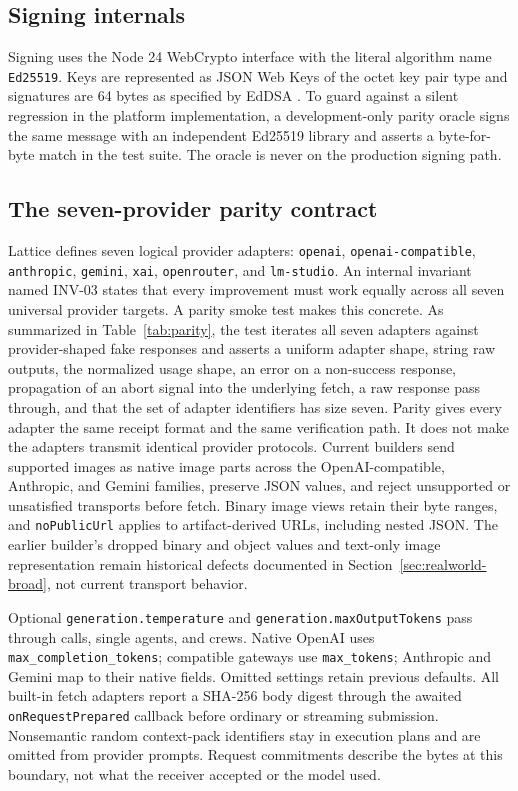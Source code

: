 \documentclass[conference]{IEEEtran}
\newcommand{\code}[1]{\texttt{\small #1}}
\begin{document}
\subsection{Signing internals}

Signing uses the Node 24 WebCrypto interface with the literal algorithm name
\code{Ed25519}. Keys are represented as JSON Web Keys of the octet key pair type and
signatures are 64 bytes as specified by EdDSA \cite{rfc8032}. To guard against a
silent regression in the platform implementation, a development-only parity oracle
signs the same message with an independent Ed25519 library and asserts a byte-for-byte
match in the test suite. The oracle is never on the production signing path.

\subsection{The seven-provider parity contract}
\label{sec:parity}

Lattice defines seven logical provider adapters: \code{openai},
\code{openai-compatible}, \code{anthropic}, \code{gemini}, \code{xai},
\code{openrouter}, and \code{lm-studio}. An internal invariant named INV-03 states
that every improvement must work equally across all seven universal provider targets.
A parity smoke test makes this concrete. As summarized in Table~\ref{tab:parity}, the
test iterates all seven adapters against provider-shaped fake responses and asserts a
uniform adapter shape, string raw outputs, the normalized usage shape, an error on a
non-success response, propagation of an abort signal into the underlying fetch, a raw
response pass through, and that the set of adapter identifiers has size seven. Parity
gives every adapter the same receipt format and the same verification path. It does not
make the adapters transmit identical provider protocols. Current builders send supported
images as native image parts across the OpenAI-compatible, Anthropic, and Gemini
families, preserve JSON values, and reject unsupported or unsatisfied transports before
fetch. Binary image views retain their byte ranges, and \code{noPublicUrl} applies to
artifact-derived URLs, including nested JSON. The earlier builder's dropped binary and
object values and text-only image representation remain historical defects documented
in Section~\ref{sec:realworld-broad}, not current transport behavior.

Optional \code{generation.temperature} and \code{generation.maxOutputTokens} pass
through calls, single agents, and crews. Native OpenAI uses
\code{max\_completion\_tokens}; compatible gateways use \code{max\_tokens};
Anthropic and Gemini map to their native fields. Omitted settings retain previous
defaults. All built-in fetch adapters report a SHA-256 body digest through the awaited
\code{onRequestPrepared} callback before ordinary or streaming submission. Nonsemantic
random context-pack identifiers stay in execution plans and are omitted from provider
prompts. Request commitments describe the bytes at this boundary, not what the receiver
accepted or the model used.
\end{document}
